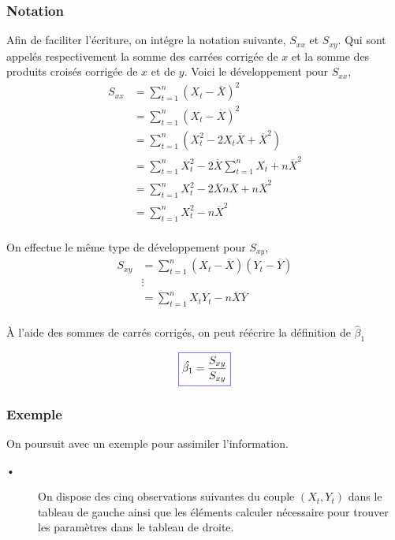 \documentclass[11pt,french]{report}
\begin{document}
\subsubsection*{Notation}
Afin de faciliter l'écriture, on intégre la notation suivante, $S_{xx}$ et  $S_{xy}$. Qui sont appelés respectivement la somme des carrées corrigée de $x$ et la somme des produits croisés corrigée de $x$ et de $y$.
Voici le développement pour $S_{xx}$,
\begin{align*}
S_{xx} &= \sum_{t=1}^n (X_t - \overline{X})^2 \\
&= \sum_{t=1}^n (X_t - \overline{X})^2 \\
&= \sum_{t=1}^n (X_t^2 - 2X_t\overline{X} + \overline{X}^2) \\
&= \sum_{t=1}^n X_t^2 - 2\overline{X}\sum_{t=1}^n X_t + n\overline{X}^2 \\
&= \sum_{t=1}^n X_t^2 - 2\overline{X}n\overline{X} + n\overline{X}^2 \\
&= \sum_{t=1}^n X_t^2 - n\overline{X}^2 \\
\end{align*}

On effectue le même type de développement pour $S_{xy}$, 
\begin{align*}
S_{xy} &= \sum_{t=1}^n (X_t - \overline{X}) (Y_t - \overline{Y}) \\
&\vdots \\
&= \sum_{t=1}^n X_tY_t - n\overline{X}\overline{Y}\\
\end{align*}

À l'aide des sommes de carrés corrigés, on peut réécrire la définition de $\hat{\beta}_1$

\begin{equation}
\label{eq:beta1SXY}
\color{blue}
\boxed{\color{black}
\hat{\beta_1} = \frac{S_{xy}}{S_{xy}}
}
\end{equation}

\bigskip
\subsubsection*{Exemple}
On poursuit avec un exemple pour assimiler l'information.

\bigskip
\begin{description}
\item[•] On dispose des cinq observations suivantes du couple $(X_t, Y_t)$ dans le tableau de gauche ainsi que les éléments calculer nécessaire pour trouver les paramètres dans le tableau de droite.
\end{description}
\end{document}

